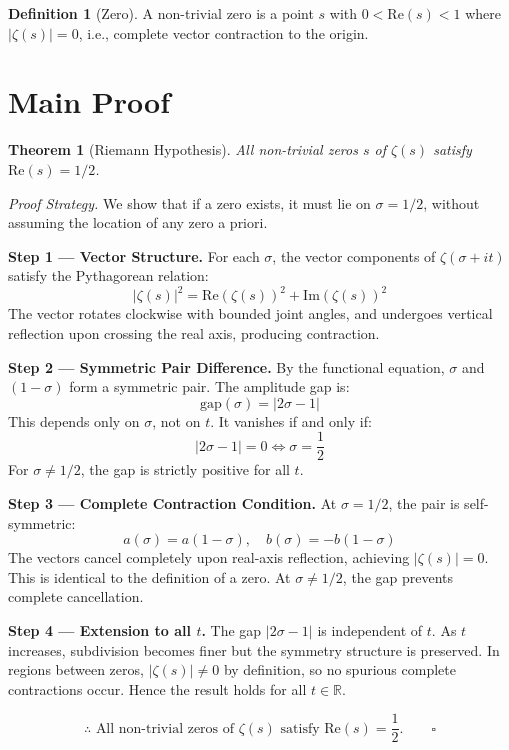 \documentclass[12pt]{article}
\newtheorem{theorem}{Theorem}
\theoremstyle{definition}
\newtheorem{definition}{Definition}
\theoremstyle{remark}
\begin{document}
\begin{definition}[Zero]
A non-trivial zero is a point $s$ with $0 < \mathrm{Re}(s) < 1$ where $|\zeta(s)| = 0$, i.e., complete vector contraction to the origin.
\end{definition}

\section{Main Proof}

\begin{theorem}[Riemann Hypothesis]
All non-trivial zeros $s$ of $\zeta(s)$ satisfy $\mathrm{Re}(s) = 1/2$.
\end{theorem}

\textit{Proof Strategy.} We show that if a zero exists, it must lie on $\sigma = 1/2$, without assuming the location of any zero a priori.

\medskip
\noindent\textbf{Step 1 — Vector Structure.}
For each $\sigma$, the vector components of $\zeta(\sigma + it)$ satisfy the Pythagorean relation:
\[
|\zeta(s)|^2 = \mathrm{Re}(\zeta(s))^2 + \mathrm{Im}(\zeta(s))^2
\]
The vector rotates clockwise with bounded joint angles, and undergoes vertical reflection upon crossing the real axis, producing contraction.

\medskip
\noindent\textbf{Step 2 — Symmetric Pair Difference.}
By the functional equation, $\sigma$ and $(1-\sigma)$ form a symmetric pair. The amplitude gap is:
\[
\mathrm{gap}(\sigma) = |2\sigma - 1|
\]
This depends only on $\sigma$, not on $t$. It vanishes if and only if:
\[
|2\sigma - 1| = 0 \iff \sigma = \frac{1}{2}
\]
For $\sigma \neq 1/2$, the gap is strictly positive for all $t$.

\medskip
\noindent\textbf{Step 3 — Complete Contraction Condition.}
At $\sigma = 1/2$, the pair is self-symmetric:
\[
a(\sigma) = a(1-\sigma), \quad b(\sigma) = -b(1-\sigma)
\]
The vectors cancel completely upon real-axis reflection, achieving $|\zeta(s)| = 0$. This is identical to the definition of a zero. At $\sigma \neq 1/2$, the gap prevents complete cancellation.

\medskip
\noindent\textbf{Step 4 — Extension to all $t$.}
The gap $|2\sigma - 1|$ is independent of $t$. As $t$ increases, subdivision becomes finer but the symmetry structure is preserved. In regions between zeros, $|\zeta(s)| \neq 0$ by definition, so no spurious complete contractions occur. Hence the result holds for all $t \in \mathbb{R}$.

\medskip
\[
\therefore \text{ All non-trivial zeros of } \zeta(s) \text{ satisfy } \mathrm{Re}(s) = \frac{1}{2}. \qquad \square
\]
\end{document}
